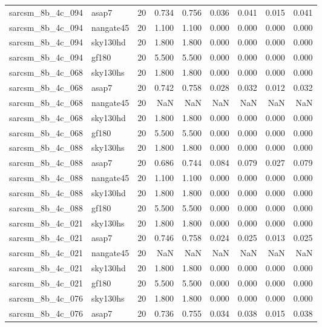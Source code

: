 \begin{tabular}{llrrrrrrr}
sarcsm\_8b\_4c\_094 & asap7 & 20 & 0.734 & 0.756 & 0.036 & 0.041 & 0.015 & 0.041 \\
sarcsm\_8b\_4c\_094 & nangate45 & 20 & 1.100 & 1.100 & 0.000 & 0.000 & 0.000 & 0.000 \\
sarcsm\_8b\_4c\_094 & sky130hd & 20 & 1.800 & 1.800 & 0.000 & 0.000 & 0.000 & 0.000 \\
sarcsm\_8b\_4c\_094 & gf180 & 20 & 5.500 & 5.500 & 0.000 & 0.000 & 0.000 & 0.000 \\
sarcsm\_8b\_4c\_068 & sky130hs & 20 & 1.800 & 1.800 & 0.000 & 0.000 & 0.000 & 0.000 \\
sarcsm\_8b\_4c\_068 & asap7 & 20 & 0.742 & 0.758 & 0.028 & 0.032 & 0.012 & 0.032 \\
sarcsm\_8b\_4c\_068 & nangate45 & 20 & NaN & NaN & NaN & NaN & NaN & NaN \\
sarcsm\_8b\_4c\_068 & sky130hd & 20 & 1.800 & 1.800 & 0.000 & 0.000 & 0.000 & 0.000 \\
sarcsm\_8b\_4c\_068 & gf180 & 20 & 5.500 & 5.500 & 0.000 & 0.000 & 0.000 & 0.000 \\
sarcsm\_8b\_4c\_088 & sky130hs & 20 & 1.800 & 1.800 & 0.000 & 0.000 & 0.000 & 0.000 \\
sarcsm\_8b\_4c\_088 & asap7 & 20 & 0.686 & 0.744 & 0.084 & 0.079 & 0.027 & 0.079 \\
sarcsm\_8b\_4c\_088 & nangate45 & 20 & 1.100 & 1.100 & 0.000 & 0.000 & 0.000 & 0.000 \\
sarcsm\_8b\_4c\_088 & sky130hd & 20 & 1.800 & 1.800 & 0.000 & 0.000 & 0.000 & 0.000 \\
sarcsm\_8b\_4c\_088 & gf180 & 20 & 5.500 & 5.500 & 0.000 & 0.000 & 0.000 & 0.000 \\
sarcsm\_8b\_4c\_021 & sky130hs & 20 & 1.800 & 1.800 & 0.000 & 0.000 & 0.000 & 0.000 \\
sarcsm\_8b\_4c\_021 & asap7 & 20 & 0.746 & 0.758 & 0.024 & 0.025 & 0.013 & 0.025 \\
sarcsm\_8b\_4c\_021 & nangate45 & 20 & NaN & NaN & NaN & NaN & NaN & NaN \\
sarcsm\_8b\_4c\_021 & sky130hd & 20 & 1.800 & 1.800 & 0.000 & 0.000 & 0.000 & 0.000 \\
sarcsm\_8b\_4c\_021 & gf180 & 20 & 5.500 & 5.500 & 0.000 & 0.000 & 0.000 & 0.000 \\
sarcsm\_8b\_4c\_076 & sky130hs & 20 & 1.800 & 1.800 & 0.000 & 0.000 & 0.000 & 0.000 \\
sarcsm\_8b\_4c\_076 & asap7 & 20 & 0.736 & 0.755 & 0.034 & 0.038 & 0.015 & 0.038 \\

\end{tabular}
